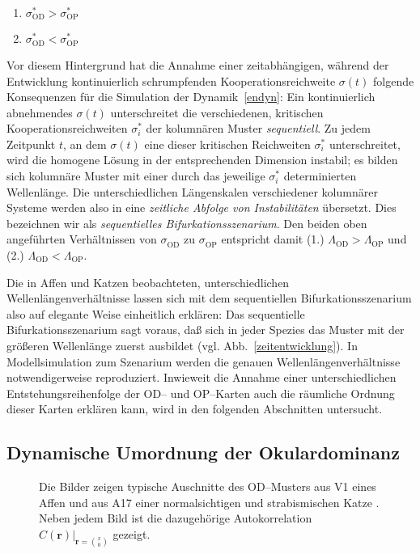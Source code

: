 \begin{enumerate}
\item $\sigma_{\text{OD}}^\ast > \sigma_{\text{OP}}^\ast$
\item $\sigma_{\text{OD}}^\ast < \sigma_{\text{OP}}^\ast$
\end{enumerate}

Vor diesem Hintergrund hat die Annahme einer zeitabhängigen, während der
Entwicklung kontinuierlich schrumpfenden Kooperationsreichweite $\sigma(t)$
folgende Konsequenzen für die Simulation der Dynamik~\eqref{endyn}: Ein
kontinuierlich abnehmendes $\sigma(t)$ unterschreitet die verschiedenen,
kritischen Kooperationsreichweiten $\sigma_i^\ast$ der
kolumnären Muster \emph{sequentiell}. Zu jedem Zeitpunkt $t$, an dem
$\sigma(t)$ eine dieser kritischen Reichweiten $\sigma_i^\ast$
unterschreitet, wird die homogene Lösung in der entsprechenden Dimension
instabil; es bilden sich kolumnäre Muster mit einer durch das jeweilige
$\sigma_i^\ast$ determinierten Wellenlänge.  Die unterschiedlichen
Längenskalen verschiedener kolumnärer Systeme werden also in eine
\emph{zeitliche Abfolge von Instabilitäten} übersetzt. Dies bezeichnen
wir als \emph{sequentielles Bifurkationsszenarium}.  Den beiden oben
angeführten Verhältnissen von $\sigma_{\text{OD}}^{\phantom{\ast}}$ zu
$\sigma_{\text{OP}}^{\phantom{\ast}}$ entspricht damit (1.)
$\Lambda_{\text{OD}} > \Lambda_{\text{OP}}$ und (2.) $\Lambda_{\text{OD}} <
\Lambda_{\text{OP}}$.

Die in Affen und Katzen beobachteten, unterschiedlichen
Wellenlängenverhältnisse lassen sich mit dem sequentiellen
Bifurkationsszenarium also auf elegante Weise einheitlich erklären: Das
sequentielle Bifurkationsszenarium sagt voraus, daß sich in jeder Spezies
das Muster mit der größeren Wellenlänge zuerst ausbildet
(vgl. Abb.~\ref{zeitentwicklung}). In Modellsimulation zum Szenarium
werden die genauen Wellenlängenverhältnisse notwendigerweise
reproduziert.  Inwieweit die Annahme einer unterschiedlichen
Entstehungsreihenfolge der OD-- und OP--Karten auch die räumliche Ordnung
dieser Karten erklären kann, wird in den folgenden Abschnitten untersucht.

\subsection{Dynamische Umordnung der Okulardominanz}
\label{odord}

\begin{figure}[t]
\begin{center}
\end{center}
\caption{Die Bilder zeigen typische Auschnitte des OD--Musters aus V1 eines
Affen \protect{} und aus A17 einer normalsichtigen und strabismischen Katze
\protect{}. Neben jedem Bild ist die dazugehörige Autokorrelation
$C(\mathbf{r})\vert_{\mathbf{r}={x\choose 0}}$ gezeigt.}
\label{odcorr}
\end{figure}

